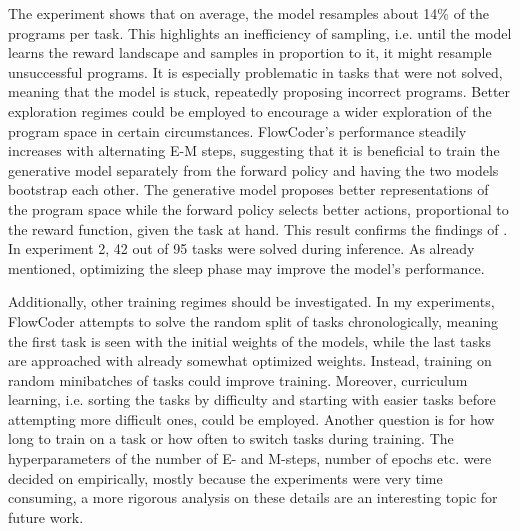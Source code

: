 The experiment shows that on average, the model resamples about 14\% of the programs per task. This highlights an inefficiency of sampling, i.e. until the model learns the reward landscape and samples in proportion to it, it might resample unsuccessful programs. It is especially problematic in tasks that were not solved, meaning that the model is stuck, repeatedly proposing incorrect programs. Better exploration regimes could be employed to encourage a wider exploration of the program space in certain circumstances.
FlowCoder's performance steadily increases with alternating E-M steps, suggesting that it is beneficial to train the generative model separately from the forward policy and having the two models bootstrap each other. The generative model proposes better representations of the program space while the forward policy selects better actions, proportional to the reward function, given the task at hand. This result confirms the findings of \citet{Hu_Malkin_Jain_Everett_Graikos_Bengio_2023}.
In experiment 2, 42 out of 95 tasks were solved during inference. As already mentioned, optimizing the sleep phase may improve the model's performance. 

Additionally, other training regimes should be investigated. In my experiments, FlowCoder attempts to solve the random split of tasks chronologically, meaning the first task is seen with the initial weights of the models, while the last tasks are approached with already somewhat optimized weights. Instead, training on random minibatches of tasks could improve training. Moreover, curriculum learning, i.e. sorting the tasks by difficulty and starting with easier tasks before attempting more difficult ones, could be employed. Another question is for how long to train on a task or how often to switch tasks during training. The hyperparameters of the number of E- and M-steps, number of epochs etc. were decided on empirically, mostly because the experiments were very time consuming, a more rigorous analysis on these details are an interesting topic for future work.

